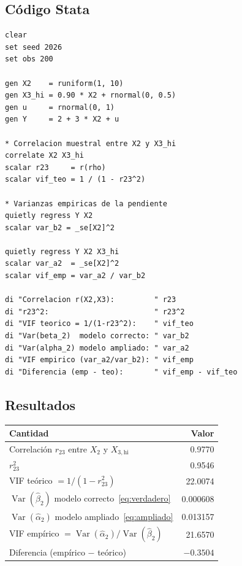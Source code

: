 \documentclass[12pt, letterpaper]{article}
\newcommand{\Var}{\operatorname{Var}}
\begin{document}
\subsection{Código Stata}

\begin{lstlisting}[caption={Verificación: VIF teórico vs. VIF empírico}]
clear
set seed 2026
set obs 200

gen X2    = runiform(1, 10)
gen X3_hi = 0.90 * X2 + rnormal(0, 0.5)
gen u     = rnormal(0, 1)
gen Y     = 2 + 3 * X2 + u

* Correlacion muestral entre X2 y X3_hi
correlate X2 X3_hi
scalar r23     = r(rho)
scalar vif_teo = 1 / (1 - r23^2)

* Varianzas empiricas de la pendiente
quietly regress Y X2
scalar var_b2 = _se[X2]^2

quietly regress Y X2 X3_hi
scalar var_a2  = _se[X2]^2
scalar vif_emp = var_a2 / var_b2

di "Correlacion r(X2,X3):         " r23
di "r23^2:                        " r23^2
di "VIF teorico = 1/(1-r23^2):    " vif_teo
di "Var(beta_2)  modelo correcto: " var_b2
di "Var(alpha_2) modelo ampliado: " var_a2
di "VIF empirico (var_a2/var_b2): " vif_emp
di "Diferencia (emp - teo):       " vif_emp - vif_teo
\end{lstlisting}

\subsection{Resultados}

\begin{center}
\renewcommand{\arraystretch}{1.3}
\small
\begin{tabular}{lr}
\toprule
\textbf{Cantidad} & \textbf{Valor} \\
\midrule
Correlación $r_{23}$ entre $X_2$ y $X_{3,\text{hi}}$     & 0.9770   \\
$r_{23}^2$                                                & 0.9546   \\
VIF teórico $= 1/(1 - r_{23}^2)$                         & 22.0074  \\
\midrule
$\Var(\hat{\beta}_2)$ modelo correcto~\eqref{eq:verdadero}  & 0.000608 \\
$\Var(\hat{\alpha}_2)$ modelo ampliado~\eqref{eq:ampliado}  & 0.013157 \\
VIF empírico $= \Var(\hat{\alpha}_2)/\Var(\hat{\beta}_2)$ & 21.6570  \\
Diferencia (empírico $-$ teórico)                         & $-0.3504$ \\
\bottomrule
\end{tabular}
\end{center}
\end{document}
